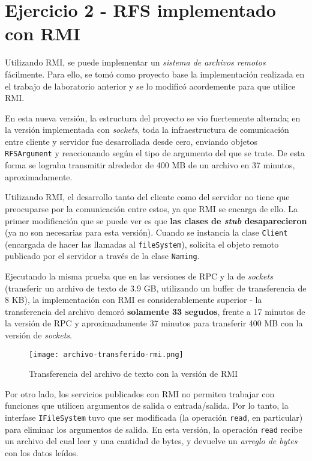 \section{Ejercicio 2 - RFS implementado con RMI}

Utilizando RMI, se puede implementar un \emph{sistema de archivos remotos} fácilmente. Para ello, se tomó como proyecto base la implementación realizada en el trabajo de laboratorio anterior y se lo modificó acordemente para que utilice RMI.

En esta nueva versión, la estructura del proyecto se vio fuertemente alterada; en la versión implementada con \emph{sockets}, toda la infraestructura de comunicación entre cliente y servidor fue desarrollada desde cero, enviando objetos \texttt{RFSArgument} y reaccionando según el tipo de argumento del que se trate. De esta forma se lograba transmitir alrededor de 400 MB de un archivo en 37 minutos, aproximadamente.

Utilizando RMI, el desarrollo tanto del cliente como del servidor no tiene que preocuparse por la comunicación entre estos, ya que RMI se encarga de ello. La primer modificación que se puede ver es que \textbf{las clases de \emph{stub} desaparecieron} (ya no son necesarias para esta versión). Cuando se instancia la clase \texttt{Client} (encargada de hacer las llamadas al \texttt{fileSystem}), solicita el objeto remoto publicado por el servidor a través de la clase \texttt{Naming}.

Ejecutando la misma prueba que en las versiones de RPC y la de \emph{sockets} (transferir un archivo de texto de 3.9 GB, utilizando un buffer de transferencia de 8 KB), la implementación con RMI es considerablemente superior - la transferencia del archivo demoró \textbf{solamente 33 segudos}, frente a 17 minutos de la versión de RPC y aproximadamente 37 minutos para transferir 400 MB con la versión de \emph{sockets}.

\begin{figure}[H]
    \centering
    \texttt{[image: archivo-transferido-rmi.png]}
    \caption{Transferencia del archivo de texto con la versión de RMI}
\end{figure}

Por otro lado, los servicios publicados con RMI no permiten trabajar con funciones que utilicen argumentos de salida o entrada/salida. Por lo tanto, la interfase \texttt{IFileSystem} tuvo que ser modificada (la operación \texttt{read}, en particular) para eliminar los argumentos de salida. En esta versión, la operación \texttt{read} recibe un archivo del cual leer y una cantidad de bytes, y devuelve un \emph{arreglo de bytes} con los datos leídos.   


